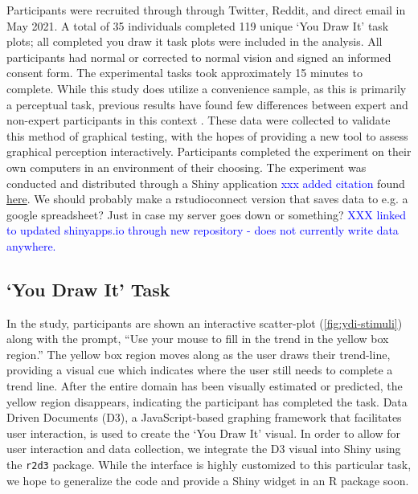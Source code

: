 \documentclass[12pt]{article}
\begin{document}
Participants were recruited through through Twitter, Reddit, and direct
email in May 2021. A total of 35 individuals completed 119 unique `You
Draw It' task plots; all completed you draw it task plots were included
in the analysis. All participants had normal or corrected to normal
vision and signed an informed consent form. The experimental tasks took
approximately 15 minutes to complete. While this study does utilize a
convenience sample, as this is primarily a perceptual task, previous
results have found few differences between expert and non-expert
participants in this context \citep{vanderplas2015spatial}. These data
were collected to validate this method of graphical testing, with the
hopes of providing a new tool to assess graphical perception
interactively. Participants completed the experiment on their own
computers in an environment of their choosing. The experiment was
conducted and distributed through a Shiny application \citep{shinyPkg}
{\textcolor{blue}{xxx added citation}} found
\href{https://emily-robinson.shinyapps.io/you-draw-it-validation-applet/}{here}.
{\textcolor{RedOrange}{We should probably make a rstudioconnect version that saves data to e.g. a google spreadsheet? Just in case my server goes down or something?}}
{\textcolor{blue}{XXX linked to updated shinyapps.io through new repository - does not currently write data anywhere.}}

\hypertarget{you-draw-it-task}{%
\subsection{`You Draw It' Task}\label{you-draw-it-task}}

In the study, participants are shown an interactive scatter-plot
(\cref{fig:ydi-stimuli}) along with the prompt, ``Use your mouse to fill
in the trend in the yellow box region.'' The yellow box region moves
along as the user draws their trend-line, providing a visual cue which
indicates where the user still needs to complete a trend line. After the
entire domain has been visually estimated or predicted, the yellow
region disappears, indicating the participant has completed the task.
Data Driven Documents (D3), a JavaScript-based graphing framework that
facilitates user interaction, is used to create the `You Draw It'
visual. In order to allow for user interaction and data collection, we
integrate the D3 visual into Shiny using the \texttt{r2d3} package.
While the interface is highly customized to this particular task, we
hope to generalize the code and provide a Shiny widget in an R package
soon.
\end{document}
